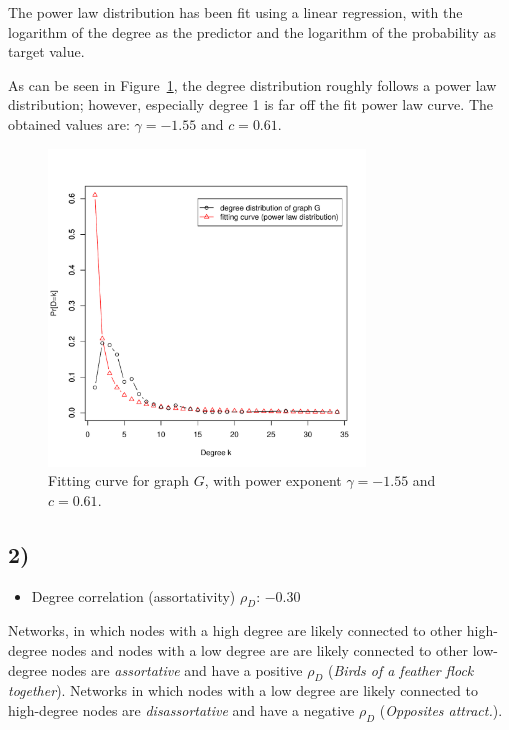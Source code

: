 \documentclass{article}
\begin{document}
The power law distribution has been fit using a linear regression,
with the logarithm of the degree as the predictor and the logarithm of
the probability as target value.

As can be seen in Figure~\ref{fig:fitted-curve}, the degree
distribution roughly follows a power law distribution; however,
especially degree 1 is far off the fit power law curve. The obtained
values are: $\gamma = - 1.55$ and $c = 0.61$.

\begin{figure}[H]
  \centering
  \includegraphics[width=0.75\textwidth]{fitted_curve_normalized}
  \caption{Fitting curve for graph $G$, with power exponent $\gamma =
    - 1.55$ and $c = 0.61$.}
  \label{fig:fitted-curve}
\end{figure}

\subsection*{2)}

\begin{itemize}
\item Degree correlation (assortativity) $\rho_D$: $-0.30$
\end{itemize}
Networks, in which nodes with a high degree are likely connected to
other high-degree nodes and nodes with a low degree are are likely
connected to other low-degree nodes are \emph{assortative} and have a
positive $\rho_D$ (\emph{Birds of a feather flock together}). Networks
in which nodes with a low degree are likely connected to high-degree
nodes are \emph{disassortative} and have a negative $\rho_D$
(\emph{Opposites attract.}).
\end{document}
